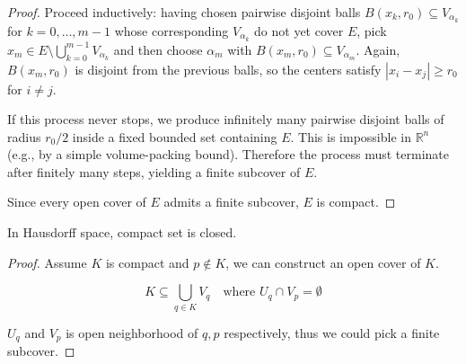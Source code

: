 \documentclass[11pt,a4paper]{article}
\begin{document}
\begin{proof}
Proceed inductively: having chosen pairwise disjoint balls $B(x_k,r_0) \subseteq V_{\alpha_k}$
for $k=0,\dots,m-1$ whose corresponding $V_{\alpha_k}$ do not yet cover $E$, pick
$x_m \in E \setminus \bigcup_{k=0}^{m-1} V_{\alpha_k}$ and then choose $\alpha_m$
with $B(x_m,r_0) \subseteq V_{\alpha_m}$. Again, $B(x_m,r_0)$ is disjoint from the
previous balls, so the centers satisfy $|x_i - x_j| \ge r_0$ for $i \ne j$.

If this process never stops, we produce infinitely many pairwise disjoint balls of
radius $r_0/2$ inside a fixed bounded set containing $E$. This is impossible in
$\mathbb{R}^n$ (e.g., by a simple volume-packing bound). Therefore the process must
terminate after finitely many steps, yielding a finite subcover of $E$.

Since every open cover of $E$ admits a finite subcover, $E$ is compact.
\end{proof}

\begin{thm}
    In Hausdorff space, compact set is closed.
\end{thm}

\begin{proof}
   Assume $K$ is compact and $p \notin K$, we can construct an open cover of $K$.

   \[
        K \subseteq \bigcup_{q \in K} V_q \quad \text{where } U_q \cap V_p = \emptyset
   \]

   $U_q$ and $V_p$ is open neighborhood of $q,p$ respectively, thus we could pick a finite subcover.
\end{proof}
\end{document}
